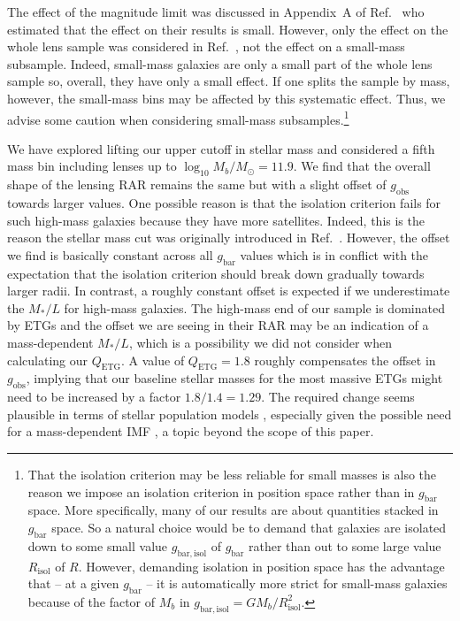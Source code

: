 \documentclass[a4paper,11pt]{article}
\begin{document}
The effect of the magnitude limit was discussed in Appendix~A of Ref.~\cite{Brouwer2021} who estimated that the effect on their results is small.
However, only the effect on the whole lens sample was considered in Ref.~\cite{Brouwer2021}, not the effect on a small-mass subsample.
Indeed, small-mass galaxies are only a small part of the whole lens sample so, overall, they have only a small effect.
If one splits the sample by mass, however, the small-mass bins may be affected by this systematic effect.
Thus, we advise some caution when considering small-mass subsamples.\footnote{
  That the isolation criterion may be less reliable for small masses is also the reason we impose an isolation criterion in position space rather than in $g_{\mathrm{bar}}$ space.
  More specifically, many of our results are about quantities stacked in $g_{\mathrm{bar}}$ space.
  So a natural choice would be to demand that galaxies are isolated down to some small value $g_{\mathrm{bar},\mathrm{isol}}$ of $g_{\mathrm{bar}}$ rather than out to some large value $R_{\mathrm{isol}}$ of $R$.
  However, demanding isolation in position space has the advantage that -- at a given $g_{\mathrm{bar}}$ -- it is automatically more strict for small-mass galaxies because of the factor of $M_b$ in $g_{\mathrm{bar},\mathrm{isol}} = G M_b/R_{\mathrm{isol}}^2$.
}

We have explored lifting our 
%
upper cutoff in stellar mass and considered a fifth mass bin including lenses up to $\log_{10} M_b/M_\odot = 11.9$. We find that the overall shape of the lensing RAR remains the same but with a slight offset of $g_{\mathrm{obs}}$ towards larger values.
One possible reason is that the isolation criterion fails for such high-mass galaxies because they have more satellites. Indeed, this is the reason the stellar mass cut was originally introduced in Ref.~\cite{Brouwer2021}.  However, the offset we find is basically constant across all $g_{\mathrm{bar}}$ values which is in conflict with the expectation that the isolation criterion should break down gradually towards larger radii. In contrast, a roughly constant offset is expected if we underestimate the $M_\ast/L$ for high-mass galaxies.
%
The high-mass end of our sample is dominated by ETGs and the offset we are seeing in their RAR may be an indication of 
%
a mass-dependent $M_\ast/L$, which is a possibility we did not consider %
when calculating our $Q_{\mathrm{ETG}}$. A value of $Q_{\mathrm{ETG}} = 1.8$ roughly compensates the offset in $g_{\mathrm{obs}}$, implying that our baseline stellar masses for the most massive ETGs might need to be increased by a factor $1.8/1.4=1.29$. The required change seems plausible in terms of stellar population models \cite{Schombert2019}, especially given the possible need for a mass-dependent IMF \cite{Cappellari2012,Conroy2012,Conroy2013}, a topic  %
beyond the scope of this paper.
%
\end{document}
